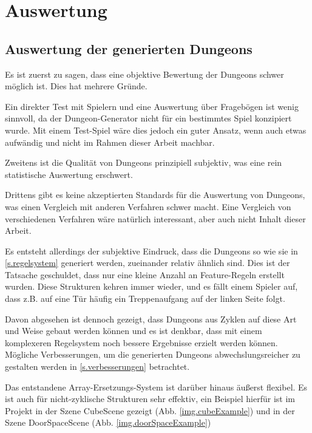 
\chapter{Auswertung}

\section{Auswertung der generierten Dungeons}

Es ist zuerst zu sagen, dass eine objektive Bewertung der Dungeons schwer möglich ist. Dies hat mehrere Gründe.

Ein direkter Test mit Spielern und eine Auswertung über Fragebögen ist wenig sinnvoll, da der Dungeon-Generator nicht für ein bestimmtes Spiel konzipiert wurde. Mit einem Test-Spiel wäre dies jedoch ein guter Ansatz, wenn auch etwas aufwändig und nicht im Rahmen dieser Arbeit machbar.

Zweitens ist die Qualität von Dungeons prinzipiell subjektiv, was eine rein statistische Auswertung erschwert.

Drittens gibt es keine akzeptierten Standards für die Auswertung von Dungeons, was einen Vergleich mit anderen Verfahren schwer macht. Eine Vergleich von verschiedenen Verfahren wäre natürlich interessant, aber auch nicht Inhalt dieser Arbeit.

Es entsteht allerdings der subjektive Eindruck, dass die Dungeons so wie sie in \ref{s.regelsystem} generiert werden, zueinander relativ ähnlich sind. Dies ist der Tatsache geschuldet, dass nur eine kleine Anzahl an Feature-Regeln erstellt wurden. Diese Strukturen kehren immer wieder, und es fällt einem Spieler auf, dass z.B. auf eine Tür häufig ein Treppenaufgang auf der linken Seite folgt. 

Davon abgesehen ist dennoch gezeigt, dass Dungeons aus Zyklen auf diese Art und Weise gebaut werden können und es ist denkbar, dass mit einem komplexeren Regelsystem noch bessere Ergebnisse erzielt werden können. Mögliche Verbesserungen, um die generierten Dungeons abwechslungsreicher zu gestalten werden in \ref{s.verbesserungen} betrachtet. 

Das entstandene Array-Ersetzungs-System ist darüber hinaus äußerst flexibel. Es ist auch für nicht-zyklische Strukturen sehr effektiv, ein Beispiel hierfür ist im Projekt in der Szene CubeScene gezeigt (Abb. \ref{img.cubeExample}) und in der Szene DoorSpaceScene (Abb. \ref{img.doorSpaceExample})

